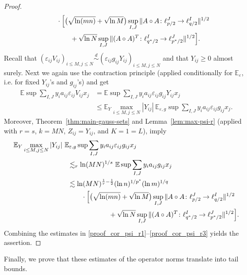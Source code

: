 \documentclass[a4paper]{amsart}
\theoremstyle{definition}
\theoremstyle{remark}
\numberwithin{equation}{section}
\newcommand*{\EE}{\mathbb{E}}
\newcommand*{\eqdistr}{\overset{d}{\sim}} %
\newcommand*{\hadprod}{\mathbin{\circ}} %
\begin{document}
\begin{proof}
\begin{align}
 		&\qquad\cdot\Bigl[ \bigl( \sqrt{\ln(mn)}+\sqrt{\ln M}\bigr) \sup_{I,J} \|A\hadprod A \colon \ell^ {J}_{p/2} \to \ell^{ I}_{q/2}\|^{1/2}	\nonumber\\
  		&\qquad\qquad+\sqrt{\ln N}  \sup_{I,J} \|(A\hadprod A)^T \colon \ell^{ I}_{q^*/2} \to \ell^ {J}_{p^*/2}\|^{1/2} \Bigr].\label{proof_cor_psi_r2}
 	\end{align}
 	Recall that  $(\varepsilon_{ij} V_{ij})_{i\leq M, j\leq N}\eqdistr (\varepsilon_{ij}g_{ij}Y_{ij})_{i\leq M, j\leq N}$ and that $Y_{ij}\ge 0$ almost surely.  
 	Next we again use the contraction principle (applied conditionally for $\EE_\varepsilon$, i.e. for fixed $Y_{ij}$'s and $g_{ij}$'s) and get
	 \begin{align} \label{proof_cor_psi_r2.5}
	\nonumber
		 \EE\sup \sum_{I,J} y_i a_{ij} \varepsilon_{ij}V_{ij}x_j
		 & =  \EE\sup \sum_{I,J} y_i a_{ij} \varepsilon_{ij}g_{ij} Y_{ij}x_j
		 \\  &
		 \le \EE_Y\max_{i\le M, j\le N} |Y_{ij}| \ \EE_{\varepsilon,g} \sup \sum_{I,J} y_i a_{ij} \varepsilon_{ij}g_{ij} x_j.
	\end{align}
	Moreover, 
	 Theorem~\ref{thm:main-gauss-sets}  and Lemma~\ref{lem:max-psi-r} (applied with $r=s$, $k=MN$, $Z_{ij}=Y_{ij}$, and $K=1=L$), imply
	\begin{align} \label{proof_cor_psi_r3}
	\nonumber
		\MoveEqLeft[8]
		\EE_Y\max_{i\le M, j\le N} |Y_{ij}| \ \EE_{\varepsilon,g}  \sup \sum_{I,J} y_i a_{ij} \varepsilon_{ij}g_{ij} x_j	   \\
		\nonumber &
		 \lesssim_{r} \ln(MN)^{1/s} \  \EE \sup \sum_{I,J} y_i a_{ij} g_{ij} x_j  		\\
		  \nonumber &
		 \lesssim \ln(MN)^{\frac 1r -\frac 12}   (\ln n)^{1/p^*}  (\ln m)^{1/q} \\
		  \nonumber
		 & \qquad \cdot\Bigl[ \bigl( \sqrt{\ln(mn)}+\sqrt{\ln M}\bigr) \sup_{I,J} \|A\hadprod A \colon \ell^ {J}_{p/2} \to \ell^{ I}_{q/2}\|^{1/2}	\\
		 & \qquad \qquad \qquad 
  		+\sqrt{\ln N}  \sup_{I,J} \|(A\hadprod A)^T \colon \ell^{ I}_{q^*/2} \to \ell^ {J}_{p^*/2}\|^{1/2} \Bigr].
	\end{align}
	Combining the estimates in \eqref{proof_cor_psi_r1}--\eqref{proof_cor_psi_r3} yields the assertion.
\end{proof}

Finally, we prove that these estimates of the operator norms translate into tail bounds.
\end{document}
